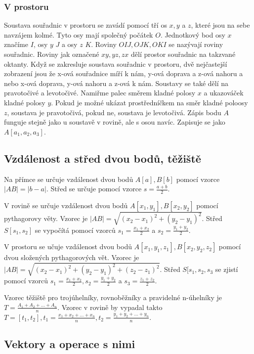 \documentclass[12pt]{article}
\begin{document}
\subsubsection*{V prostoru}

Soustava souřadnic v prostoru se zavádí pomocí tří os $x, y$ a $z$, které jsou na sebe navzájem kolmé.
Tyto osy mají společný počátek $O$. Jednotkový bod osy $x$ značíme $I$, osy $y$ $J$ a osy $z$ $K$.
Roviny $OIJ, OJK, OKI$ se nazývají roviny souřadnic. Roviny jak označené $xy, yz, zx$ dělí prostor
souřadnic na takzvané oktanty. Když se zakresluje soustava souřadnic v prostoru, dvě nejčastejší
zobrazení jsou že x-ová souřadnice míří k nám, y-ová doprava a z-ová nahoru a nebo x-ová doprava,
y-ová nahoru a z-ová k nám. Soustavy se také dělí na pravotočivé a levotočivé. Namiřme palec směrem
kladné polosy $x$ a ukazováček kladné polosy $y$. Pokud je možné ukázat prostředníčkem na směr kladné
poloosy $z$, soustava je pravotočivá, pokud ne, soustava je levotočivá. Zápis bodu $A$ funguje
stejně jako u soustavě v rovině, ale s osou navíc. Zapisuje se jako $A[a_1, a_2, a_3]$.

\subsection*{Vzdálenost a střed dvou bodů, těžiště}
Na přímce se určuje vzdálenost dvou bodů $A[a], B[b]$ pomocí vzorce $|AB| = |b - a|$. Střed se určuje
pomocí vzorce $s = \frac{a + b}{2}$.

V rovině se určuje vzdálenost dvou bodů $A[x_1, y_1], B[x_2, y_2]$ pomocí pythagorovy věty. Vzorec
je $|AB| = \sqrt{(x_2 - x_1)^2 + (y_2 - y_1)^2}.$ Střed $S[s_1, s_2]$ se vypočítá pomocí vzorců $s_1 
= \frac{x_1 + x_2}{2}$ a $s_2 = \frac{y_1 + y_2}{2}$.

V prostoru se učuje vzdálenost dvou bodů $A[x_1, y_1, z_1], B[x_2, y_2, z_2]$ pomocí dvou složených
pythagorových vět. Vzorec je $|AB| = \sqrt{(x_2 - x_1)^2 + (y_2 - y_1)^2 + (z_2 - z_1)^2}$. Střed
$S[s_1, s_2, s_3$ se zjistí pomocí vzorců $s_1 = \frac{x_1 + x_2}{2}, s_2 = \frac{y_1 + y_2}{2}$ a 
$s_3 = \frac{z_1 + z_2}{2}$.

Vzorec těžiště pro trojúhelníky, rovnoběžníky a pravidelné n-úhelníky je $T = \frac{A_1 + A_2 + \dots
+ A_n}{n}$. Vzorec v rovině by vypadal takto $T = [t_1, t_2], t_1 = \frac{x_1 + x_2 + \dots + x_n}{n}
, t_2 = \frac{y_1 + y_2 + \dots + y_n}{n}$.
\subsection*{Vektory a operace s nimi}
\end{document}
